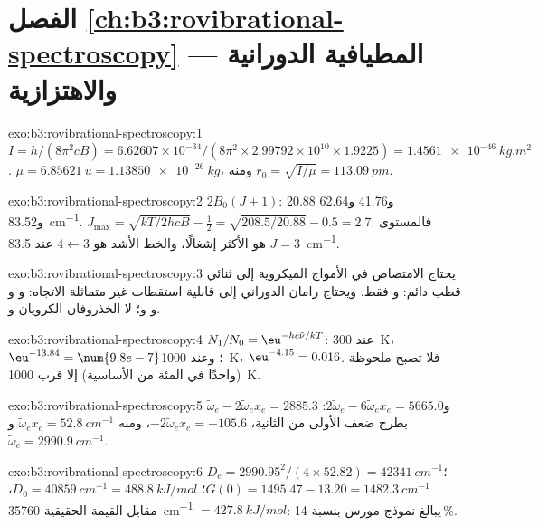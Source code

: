 \section*{الفصل \ref{ch:b3:rovibrational-spectroscopy} --- المطيافية الدورانية والاهتزازية}

\begin{solution}{exo:b3:rovibrational-spectroscopy:1}
$I = h/(8\pi^2cB) = 6.62607 \times 10^{-34}/(8\pi^2 \times 2.99792 \times 10^{10} \times
1.9225) = \qty{1.4561e-46}{kg.m^2}$. $\mu = \qty{6.85621}{u} = \qty{1.13850e-26}{kg}$، ومنه
$r_0 = \sqrt{I/\mu} = \qty{113.09}{pm}$.
\end{solution}

\begin{solution}{exo:b3:rovibrational-spectroscopy:2}
$2B_0(J+1)$: 20.88 و41.76 و62.64 و\qty{83.52}{cm^{-1}}. $J_{\max} = \sqrt{kT/2hcB} -
\frac12 = \sqrt{208.5/20.88} - 0.5 = 2.7$: فالمستوى $J = 3$ هو الأكثر
إشغالًا، والخط الأشد هو $4 \leftarrow 3$ عند \qty{83.5}{cm^{-1}}.
\end{solution}

\begin{solution}{exo:b3:rovibrational-spectroscopy:3}
يحتاج الامتصاص في الأمواج الميكروية إلى ثنائي قطب دائم:  و فقط.
ويحتاج رامان الدوراني إلى قابلية استقطاب غير متماثلة الاتجاه:  و و
و و؛ لا الخذروفان الكرويان  و.
\end{solution}

\begin{solution}{exo:b3:rovibrational-spectroscopy:4}
$N_1/N_0 = \eu^{-hc\tilde\nu/kT}$: عند \qty{300}{K}، $\eu^{-13.84} = \num{9.8e-7}$؛ وعند
\qty{1000}{K}، $\eu^{-4.15} = 0.016$. فلا تصبح  ملحوظة (واحدًا في المئة من
الأساسية) إلا قرب \qty{1000}{K}.
\end{solution}

\begin{solution}{exo:b3:rovibrational-spectroscopy:5}
$\tilde\omega_e - 2\tilde\omega_ex_e = 2885.3$ و$2\tilde\omega_e - 6\tilde\omega_ex_e =
5665.0$: بطرح ضعف الأولى من الثانية، $-2\tilde\omega_ex_e = -105.6$،
ومنه $\tilde\omega_ex_e = \qty{52.8}{cm^{-1}}$ و$\tilde\omega_e = \qty{2990.9}{cm^{-1}}$.
\end{solution}

\begin{solution}{exo:b3:rovibrational-spectroscopy:6}
$D_e = 2990.95^2/(4 \times 52.82) = \qty{42341}{cm^{-1}}$؛ $G(0) = 1495.47 - 13.20 =
\qty{1482.3}{cm^{-1}}$؛ $D_0 = \qty{40859}{cm^{-1}} = \qty{488.8}{kJ/mol}$، مقابل القيمة الحقيقية
\qty{35760}{cm^{-1}} $= \qty{427.8}{kJ/mol}$: يبالغ نموذج مورس بنسبة 14\,\%.
\end{solution}

